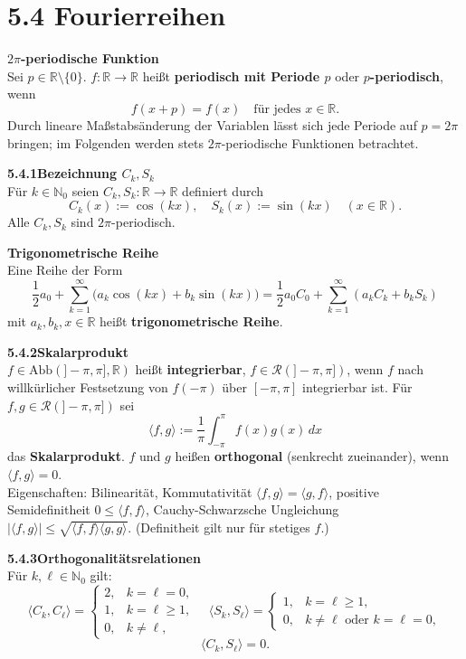 \documentclass[a4paper,12pt]{article}
\newcommand{\gentry}[3]{%
  \noindent\textbf{#1\quad #2}\nopagebreak\\[0.2em]
  #3\par\smallskip
}
\begin{document}
\section*{5.4 \quad Fourierreihen}

\gentry{}{$2\pi$-periodische Funktion}{%
  Sei $p \in \mathbb{R}\setminus\{0\}$. $f: \mathbb{R} \to \mathbb{R}$ heißt
  \textbf{periodisch mit Periode $p$} oder \textbf{$p$-periodisch}, wenn
  \[
    f(x+p) = f(x) \quad \text{für jedes } x \in \mathbb{R}.
  \]
  Durch lineare Maßstabsänderung der Variablen lässt sich jede Periode auf
  $p = 2\pi$ bringen; im Folgenden werden stets $2\pi$-periodische Funktionen
  betrachtet.
}

\gentry{5.4.1}{Bezeichnung $C_k, S_k$}{%
  Für $k \in \mathbb{N}_0$ seien $C_k, S_k: \mathbb{R} \to \mathbb{R}$ definiert durch
  \[
    C_k(x) := \cos(kx), \quad S_k(x) := \sin(kx) \quad (x \in \mathbb{R}).
  \]
  Alle $C_k, S_k$ sind $2\pi$-periodisch.
}

\gentry{}{Trigonometrische Reihe}{%
  Eine Reihe der Form
  \[
    \frac{1}{2} a_0 + \sum_{k=1}^\infty \bigl(a_k \cos(kx) + b_k \sin(kx)\bigr)
    = \frac{1}{2} a_0 C_0 + \sum_{k=1}^\infty (a_k C_k + b_k S_k)
  \]
  mit $a_k, b_k, x \in \mathbb{R}$ heißt \textbf{trigonometrische Reihe}.
}

\gentry{5.4.2}{Skalarprodukt}{%
  $f \in \mathrm{Abb}(]-\pi,\pi], \mathbb{R})$ heißt \textbf{integrierbar},
  $f \in \mathcal{R}(]-\pi,\pi])$, wenn $f$ nach willkürlicher Festsetzung von
  $f(-\pi)$ über $[-\pi,\pi]$ integrierbar ist. Für $f, g \in \mathcal{R}(]-\pi,\pi])$
  sei
  \[
    \langle f, g \rangle := \frac{1}{\pi} \int_{-\pi}^\pi f(x) g(x)\,dx
  \]
  das \textbf{Skalarprodukt}. $f$ und $g$ heißen \textbf{orthogonal}
  (senkrecht zueinander), wenn $\langle f, g \rangle = 0$.\\
  Eigenschaften: Bilinearität, Kommutativität $\langle f,g \rangle = \langle g,f\rangle$,
  positive Semidefinitheit $0 \leq \langle f, f \rangle$, Cauchy-Schwarzsche
  Ungleichung $|\langle f,g\rangle| \leq \sqrt{\langle f,f\rangle\langle g,g\rangle}$.
  (Definitheit gilt nur für stetiges $f$.)
}

\gentry{5.4.3}{Orthogonalitätsrelationen}{%
  Für $k, \ell \in \mathbb{N}_0$ gilt:
  \[
    \langle C_k, C_\ell \rangle =
    \begin{cases} 2, & k=\ell=0,\\ 1, & k=\ell \geq 1,\\ 0, & k\neq\ell,\end{cases}
    \quad
    \langle S_k, S_\ell \rangle =
    \begin{cases} 1, & k=\ell \geq 1,\\ 0, & k\neq\ell \text{ oder } k=\ell=0,\end{cases}
  \]
  \[
    \langle C_k, S_\ell \rangle = 0.
  \]
}
\end{document}
